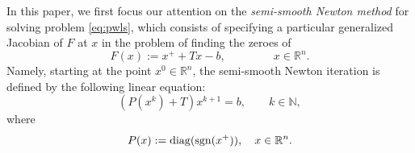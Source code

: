 \documentclass[11pt]{article}
\newcommand{\R}{\mathbb R}
\newcommand{\NN}{\mathbb{N}}
\begin{document}
In this paper, we first focus our attention on the {\it semi-smooth Newton method} for solving problem \eqref{eq:pwls}, which consists of specifying a particular generalized Jacobian of $F$ at $x$ in the problem of finding the zeroes of
\begin{equation} \label{eq:fucpw}
F(x):=x^+ + Tx- b,  \qquad \qquad  ~x \in \R^n.
\end{equation}
Namely, starting at the point  $x^{0}\in \R^n$,
the semi-smooth Newton iteration is defined by the following linear equation:
\begin{equation}\label{eq:newtonc2pw}
\left(P(x^{k}) +T\right)x^{k+1}=b,  \qquad k\in\NN,
\end{equation} where
\begin{equation}\label{P(x)}P(x) := {\rm diag}({\rm sgn}(x^+
)),\quad x \in \R^n. \end{equation} 
\end{document}
